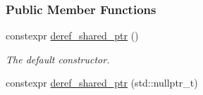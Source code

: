 \subsubsection*{Public Member Functions}
\begin{DoxyCompactItemize}
\item 
constexpr \hyperlink{classderef__shared__ptr_a1471a2c04d725614d591c588732d8330}{deref\+\_\+shared\+\_\+ptr} ()\hypertarget{classderef__shared__ptr_a1471a2c04d725614d591c588732d8330}{}\label{classderef__shared__ptr_a1471a2c04d725614d591c588732d8330}

\begin{DoxyCompactList}\small\item\em The default constructor. \end{DoxyCompactList}\item 
constexpr \hyperlink{classderef__shared__ptr_a7945ccf752b1e3e22db5e5ad4639cf3d}{deref\+\_\+shared\+\_\+ptr} (std\+::nullptr\+\_\+t)\hypertarget{classderef__shared__ptr_a7945ccf752b1e3e22db5e5ad4639cf3d}{}\label{classderef__shared__ptr_a7945ccf752b1e3e22db5e5ad4639cf3d}


\end{DoxyCompactItemize}
